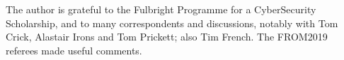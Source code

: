 \documentclass{eptcs}
\begin{document}
\par{} The author is grateful to the Fulbright Programme for a CyberSecurity Scholarship, and to many correspondents and discussions, notably with Tom Crick, Alastair Irons and Tom Prickett; also Tim French. The FROM2019 referees made useful comments.

\end{document}

